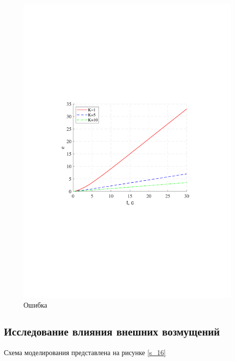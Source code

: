 \documentclass[a4paper,12pt]{article}
\begin{document}
	\begin{figure}[h!]
		\begin{center}
		\renewcommand{\figurename}{Рисунок}
		\includegraphics[width=5in]{err3ast1MOD.pdf}
		\caption{Ошибка}
		\label{s_15}
		\end{center}
	\end{figure}
	\newpage
	\begin{center}		
		\section{Исследование влияния внешних возмущений}
	\end{center}
	\paragraph {} Схема моделирования представлена на рисунке \ref{s_16}
	
\end{document}
